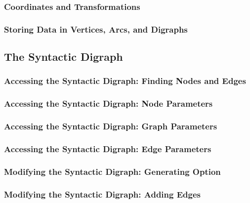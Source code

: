 \subsubsection{Coordinates and Transformations}


\subsubsection{Storing Data in Vertices, Arcs, and Digraphs}



\subsection{The Syntactic Digraph}

\label{section-gd-syntactic-digraph}


\subsubsection{Accessing the Syntactic Digraph: Finding Nodes and Edges}

\subsubsection{Accessing the Syntactic Digraph: Node Parameters}

\subsubsection{Accessing the Syntactic Digraph: Graph Parameters}

\subsubsection{Accessing the Syntactic Digraph: Edge Parameters}

\subsubsection{Modifying the Syntactic Digraph: Generating Option}

\subsubsection{Modifying the Syntactic Digraph: Adding Edges}


